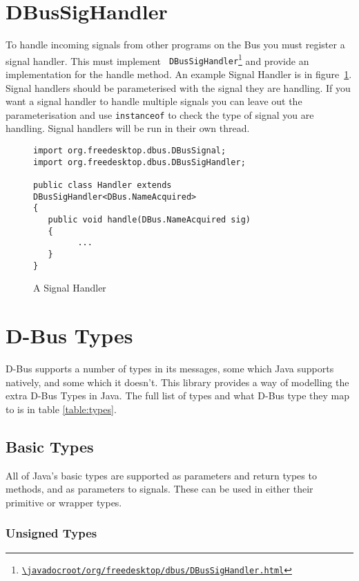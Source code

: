 \documentclass[a4paper,12pt]{article}
\begin{document}
\section{DBusSigHandler}

To handle incoming signals from other programs on the Bus you must register a
signal handler. This must implement {\tt
DBusSigHandler\footnote{\url{\javadocroot/org/freedesktop/dbus/DBusSigHandler.html}}}
and provide an implementation for the handle method. An example Signal Handler
is in figure~\ref{fig:handler}. Signal handlers should be parameterised with
the signal they are handling. If you want a signal handler to handle multiple
signals you can leave out the parameterisation and use {\tt instanceof} to
check the type of signal you are handling. Signal handlers will be run in their
own thread.

\begin{figure}[htb]
\begin{center}
\begin{verbatim}
import org.freedesktop.dbus.DBusSignal;
import org.freedesktop.dbus.DBusSigHandler;

public class Handler extends DBusSigHandler<DBus.NameAcquired>
{
   public void handle(DBus.NameAcquired sig)
   {
         ...
   }
}
\end{verbatim}
\end{center}
\caption{A Signal Handler}
\label{fig:handler}
\end{figure}


\section{D-Bus Types}

D-Bus supports a number of types in its messages, some which Java
supports natively, and some which it doesn't. This library provides
a way of modelling the extra D-Bus Types in Java. The full list of
types and what D-Bus type they map to is in table \ref{table:types}.

\subsection{Basic Types}

All of Java's basic types are supported as parameters and return types to methods, and as parameters to signals. These can be used in either their primitive or wrapper types.

\subsubsection{Unsigned Types}
\end{document}
